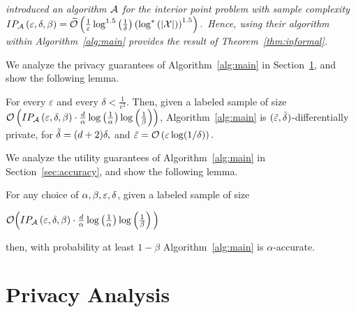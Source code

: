\documentclass[12pt,a4paper,oneside,onecolumn]{book}
\begin{document}
\begin{myremark}{\em
\citet{KaplanLMNS20} introduced an algorithm $\mathcal{A}$ for the interior point problem with sample complexity 
$
IP_{\mathcal{A}}\left(\varepsilon,\delta,\beta\right)=
\widetilde{\mathcal{O}}\left(\frac{1}{\varepsilon} \log^{1.5}\left(\frac{1}{\delta}\right)\left(\log^*\left(|\mathcal{X}|\right)\right)^{1.5}\right).
$
Hence, using their algorithm within Algorithm~\ref{alg:main} provides the result of Theorem~\ref{thm:informal}.
}\end{myremark}

We analyze the privacy guarantees of Algorithm~\ref{alg:main} in Section~\ref{sec:privacy-analysis}, and show the following lemma.

\begin{lemma}
\label{lem:privacy}
For every $\varepsilon$ and every $\delta < \frac{1}{e^2}$.
Then, given a labeled sample of size
$\mathcal{O}\left( IP_{\mathcal{A}}\left(\varepsilon,\delta,\beta\right)\cdot   \frac{d}{\alpha}\log\left(\frac{1}{\alpha}\right)
  \log\left(\frac{1}{\beta}\right)\right)$,
Algorithm~\ref{alg:main} is $(\tilde{\varepsilon},\tilde{\delta})$-differentially private,
for
$
\tilde{\delta} = (d+2)\delta,$
and
$\tilde{\varepsilon} = \mathcal{O}\left(\varepsilon\log(1/\delta)\right).
$
\end{lemma}

We analyze the utility guarantees of Algorithm~\ref{alg:main} in Section~\ref{sec:accuracy},
and show the following lemma.

\begin{lemma}
\label{lem:accuracy}
For any choice of $\alpha, \beta, \varepsilon, \delta$,
given a labeled sample of size

$\mathcal{O}\Big( IP_{\mathcal{A}}\left(\varepsilon,\delta,\beta\right)\cdot  
\frac{d}{\alpha}\log\left(\frac{1}{\alpha}\right)
  \log\left(\frac{1}{\beta}\right)\Big)$

then, with probability at least $1-\beta$
Algorithm~\ref{alg:main} is $\alpha$-accurate.
\end{lemma}

\section{Privacy Analysis}
\label{sec:privacy-analysis}
\end{document}
